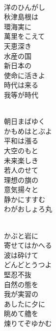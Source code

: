 \documentclass[10pt,b5j]{tarticle} %
\begin{document}
\vspace{1.5em} %
\newcommand{\linespace}{0.5em} %
\newcommand{\blocksize}{0.5\hsize} %
\newcommand{\itemmargin}{3em} %
\begin{enumerate} %
    \setlength{\itemindent}{\itemmargin} %
    \begin{minipage}[c]{\blocksize}
    
        \vspace{\linespace}
        \item~\\
        洋のひんがし\\
        秋津島根は\\
        環海実に\\
        萬里をこえて\\
        天恵深き\\
        水産の国\\
        新日本の\\
        使命に活きよ\\
        時代は来る\\
        我等が時代
        
    \end{minipage}
    \begin{minipage}[c]{\blocksize}
        
        \vspace{\linespace}
        \item~\\
        朝日まばゆく\\
        かもめはとぶよ\\
        平和は漲る\\
        大空のもと\\
        未来楽しき\\
        若人のせて\\
        理想の旗の\\
        意気揚々と\\
        静かにすすむ\\
        わがおしょろ丸
        
    \end{minipage}
    \begin{minipage}[c]{\blocksize}
        
        \vspace{\linespace}
        \item~\\
        かぶと岩に\\
        寄せてはかへる\\
        波は砕けて\\
        どんどとうつよ\\
        堅忍不抜\\
        自然の態を\\
        我が実習の\\
        あしたに夕に\\
        眺めて艪を\\
        煉りてぞゆかむ
        

\end{minipage}
\end{enumerate}
\end{document}
